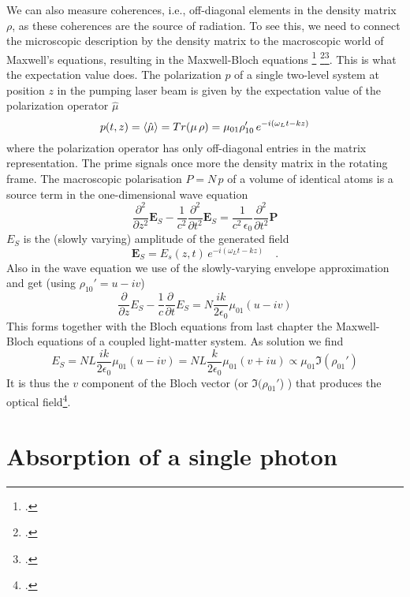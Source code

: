 We can also measure coherences, i.e., off-diagonal elements in the density matrix $\rho$, as these coherences are the source of radiation. To see this, we need to connect the microscopic description by the density matrix to the macroscopic world of Maxwell's equations, resulting in the Maxwell-Bloch equations \footcite[chapter 8.3]{MilonniEberly1988} \footcite[chapter 3.9]{Rand2016}\footcite{Meschede-OLL}. This is what the expectation value does. The  polarization $p$ of a single two-level system at position $z$ in the pumping laser beam is given by the expectation value of the polarization operator $\hat{\mu}$
\[
 p(t,z) = \braket{\hat{\mu}} = Tr ( \mu \, \rho) = \mu_{01} \rho_{10}'  \, e^{-i (\omega_L t - k z)}  
\]
where the polarization operator has only off-diagonal entries in the matrix representation. The prime signals once more the density matrix in the rotating frame. The macroscopic polarisation $P = N \, p$ of a volume of identical atoms is a source term in the one-dimensional wave equation
\[
  \frac{\partial^2}{\partial z^2} \boldsymbol{E}_S  - \frac{1}{c^2} \frac{\partial^2}{\partial t^2} \boldsymbol{E}_S 
 =  
\frac{1}{c^2\, \epsilon_0} \frac{\partial^2}{\partial t^2} \boldsymbol{P}  
\]
$E_S$ is the (slowly varying) amplitude of the generated field
\[
 \boldsymbol{E}_S =   E_s(z,t) \, e^{-i (\omega_L t - k z)}   \quad .
\]
Also in the wave equation we  use of the slowly-varying envelope approximation and get (using $\rho_{10}' = u - i v$)
\[
  \frac{\partial}{\partial z} E_S  - \frac{1}{c} \frac{\partial}{\partial t} E_S
 =  
N \frac{i k }{2 \epsilon_0}  \mu_{01} ( u - i v)
\]
This forms together with the Bloch equations from last chapter the Maxwell-Bloch equations of a coupled light-matter system. As solution we find
\[
 E_S = N L \frac{i k }{2 \epsilon_0}  \mu_{01} ( u - i v)
 =
  N L \frac{k }{2 \epsilon_0}  \mu_{01} (v + i u)
  \propto \mu_{01} \Im (\rho_{01}' ) 
\]
It is thus the $v$ component of the Bloch vector (or $\Im (\rho_{01}'$) ) that produces the optical field\footcite[chapter V.B.1]{CT-atom-photon}.
%


\section{Absorption of a single photon}

